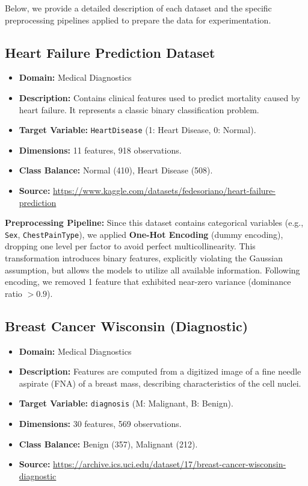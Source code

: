 \documentclass[a4paper,11pt,twoside]{report}
\theoremstyle{definition}
\begin{document}
Below, we provide a detailed description of each dataset and the specific preprocessing pipelines applied to prepare the data for experimentation.

\subsection{Heart Failure Prediction Dataset}

\begin{itemize}
    \item \textbf{Domain:} Medical Diagnostics
    \item \textbf{Description:} Contains clinical features used to predict mortality caused by heart failure. It represents a classic binary classification problem.
    \item \textbf{Target Variable:} \texttt{HeartDisease} (1: Heart Disease, 0: Normal).
    \item \textbf{Dimensions:} 11 features, 918 observations.
    \item \textbf{Class Balance:} Normal (410), Heart Disease (508).
    \item \textbf{Source:} \url{https://www.kaggle.com/datasets/fedesoriano/heart-failure-prediction}~\cite{heart}
\end{itemize}

\textbf{Preprocessing Pipeline:}
Since this dataset contains categorical variables (e.g., \texttt{Sex}, \texttt{ChestPainType}), we applied \textbf{One-Hot Encoding} (dummy encoding), dropping one level per factor to avoid perfect multicollinearity. This transformation introduces binary features, explicitly violating the Gaussian assumption, but allows the models to utilize all available information. Following encoding, we removed 1 feature that exhibited near-zero variance (dominance ratio $> 0.9$).

\subsection{Breast Cancer Wisconsin (Diagnostic)}

\begin{itemize}
    \item \textbf{Domain:} Medical Diagnostics
    \item \textbf{Description:} Features are computed from a digitized image of a fine needle aspirate (FNA) of a breast mass, describing characteristics of the cell nuclei.
    \item \textbf{Target Variable:} \texttt{diagnosis} (M: Malignant, B: Benign).
    \item \textbf{Dimensions:} 30 features, 569 observations.
    \item \textbf{Class Balance:} Benign (357), Malignant (212).
    \item \textbf{Source:} \url{https://archive.ics.uci.edu/dataset/17/breast-cancer-wisconsin-diagnostic}~\cite{breast}
\end{itemize}
\end{document}

